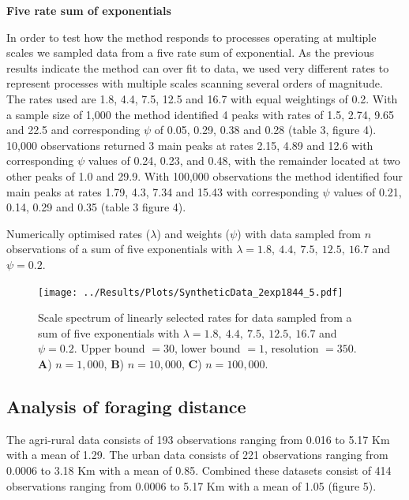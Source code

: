 \documentclass[11pt,usenames,dvipsnames,a4paper]{article}
\begin{document}
\noindent
\textbf{Five rate sum of exponentials}
\begin{linenumbers}

In order to test how the method responds to processes operating at multiple scales we sampled data from a five rate sum of exponential. As the previous results indicate the method can over fit to data, we used very different rates to represent processes with multiple scales scanning several orders of magnitude. The rates used are 1.8, 4.4, 7.5, 12.5 and 16.7 with equal weightings of 0.2. With a sample size of 1,000 the method identified 4 peaks with rates of 1.5, 2.74, 9.65 and 22.5 and corresponding $\psi$ of 0.05, 0.29, 0.38 and 0.28 (table 3, figure 4). 10,000 observations returned 3 main peaks at rates 2.15, 4.89 and 12.6 with corresponding $\psi$ values of 0.24, 0.23, and 0.48, with the remainder located at two other peaks of 1.0 and 29.9. With 100,000 observations the method identified four main peaks at rates 1.79, 4.3, 7.34 and 15.43 with corresponding $\psi$ values of 0.21, 0.14, 0.29 and 0.35 (table 3 figure 4). 
\end{linenumbers}
\begin{table}[H]
	\centering
	\caption{Numerically optimised rates ($\lambda$) and weights ($\psi$) with data sampled from $n$ observations of a sum of five exponentials with $\lambda = 1.8,\ 4.4,\ 7.5,\ 12.5,\ 16.7$ and $\psi = 0.2$.}
	
\end{table}
\begin{figure}[H]
	\centering
	\texttt{[image: ../Results/Plots/SyntheticData\_2exp1844\_5.pdf]}
	\caption{Scale spectrum of linearly selected rates for data sampled from a sum of five exponentials with $\lambda = 1.8,\ 4.4,\ 7.5,\ 12.5,\ 16.7$ and $\psi = 0.2$. Upper bound $= 30$, lower bound $= 1$, resolution $= 350$. \textbf{A}) $n = 1,000$, \textbf{B}) $n = 10,000$,  \textbf{C}) $n = 100,000$.}
\end{figure}

\subsection{Analysis of foraging distance}

\begin{linenumbers}
\hspace{\parindent}
The agri-rural data consists of 193 observations ranging from 0.016 to 5.17 Km with a mean of 1.29. The urban data consists of 221 observations ranging from 0.0006 to 3.18 Km with a mean of 0.85. Combined these datasets consist of 414 observations ranging from 0.0006 to 5.17 Km with a mean of 1.05 (figure 5).
\end{linenumbers}
\end{document}
